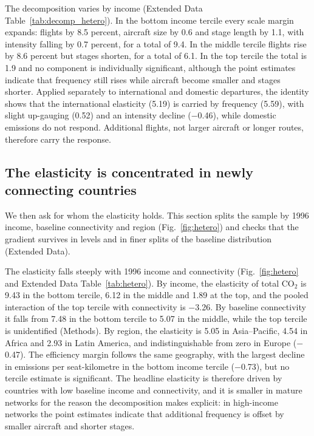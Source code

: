 \documentclass[12pt]{extarticle}
\begin{document}
The decomposition varies by income (Extended Data
Table~\ref{tab:decomp_hetero}). In
the bottom income tercile every scale margin expands: flights by 8.5
percent, aircraft size by 0.6 and stage length by 1.1, with intensity
falling by 0.7 percent, for a total of 9.4. In the middle tercile flights
rise by 8.6 percent but stages shorten, for a total of 6.1. In the top
tercile the total is 1.9 and no component is individually significant,
although the point estimates indicate that frequency still rises while
aircraft become smaller and stages shorter. Applied separately to
international and domestic departures, the identity shows that the
international elasticity (5.19) is carried by frequency (5.59), with
slight up-gauging (0.52) and an intensity decline ($-$0.46), while
domestic emissions do not respond. Additional flights, not larger aircraft or longer routes, therefore carry
the response.

\subsection*{The elasticity is concentrated in newly connecting countries}
We then ask for whom the elasticity holds. This section splits the sample
by 1996 income, baseline connectivity and region (Fig.~\ref{fig:hetero})
and checks that the gradient survives in levels and in finer splits of the
baseline distribution (Extended Data).

The elasticity falls steeply with 1996 income and connectivity
(Fig.~\ref{fig:hetero} and Extended Data Table~\ref{tab:hetero}). By
income, the elasticity of total CO$_2$ is 9.43 in the bottom tercile, 6.12
in the middle and 1.89 at the top, and the pooled interaction of the top
tercile with connectivity is $-$3.26. By baseline connectivity it falls
from 7.48 in the bottom tercile to 5.07 in the middle, while the top
tercile is unidentified (Methods). By region, the elasticity is 5.05 in
Asia--Pacific, 4.54 in Africa and 2.93 in Latin America, and
indistinguishable from zero in Europe ($-$0.47). The efficiency margin
follows the same geography, with the largest decline in emissions per
seat-kilometre in the bottom income tercile ($-$0.73), but no tercile
estimate is significant. The headline elasticity is
therefore driven by countries with low baseline income and connectivity,
and it is smaller in mature networks for the reason the decomposition
makes explicit: in high-income networks the point estimates indicate that
additional frequency is offset by smaller aircraft and shorter stages.
\end{document}
